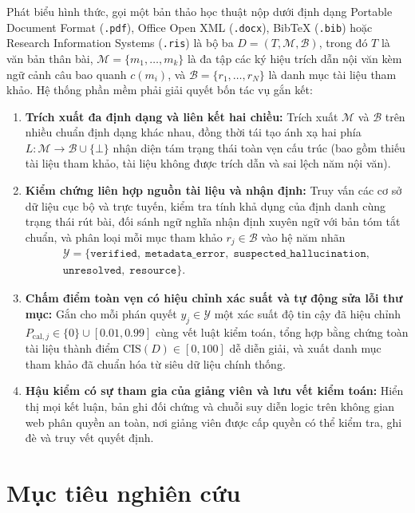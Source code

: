 Phát biểu hình thức, gọi một bản thảo học thuật nộp dưới định dạng Portable Document Format (\texttt{.pdf}), Office Open XML (\texttt{.docx}), BibTeX (\texttt{.bib}) hoặc Research Information Systems (\texttt{.ris}) là bộ ba $D = (T, \mathcal{M}, \mathcal{B})$, trong đó $T$ là văn bản thân bài, $\mathcal{M} = \{m_1, \dots, m_k\}$ là đa tập các ký hiệu trích dẫn nội văn kèm ngữ cảnh câu bao quanh $c(m_i)$, và $\mathcal{B} = \{r_1, \dots, r_N\}$ là danh mục tài liệu tham khảo. Hệ thống phần mềm phải giải quyết bốn tác vụ gắn kết:
\begin{enumerate}
    \item \textbf{Trích xuất đa định dạng và liên kết hai chiều:} Trích xuất $\mathcal{M}$ và $\mathcal{B}$ trên nhiều chuẩn định dạng khác nhau, đồng thời tái tạo ánh xạ hai phía $L: \mathcal{M} \to \mathcal{B} \cup \{\bot\}$ nhận diện tám trạng thái toàn vẹn cấu trúc (bao gồm thiếu tài liệu tham khảo, tài liệu không được trích dẫn và sai lệch năm nội văn).
    \item \textbf{Kiểm chứng liên hợp nguồn tài liệu và nhận định:} Truy vấn các cơ sở dữ liệu cục bộ và trực tuyến, kiểm tra tính khả dụng của định danh cùng trạng thái rút bài, đối sánh ngữ nghĩa nhận định xuyên ngữ với bản tóm tắt chuẩn, và phân loại mỗi mục tham khảo $r_j \in \mathcal{B}$ vào hệ năm nhãn
    \[\begin{gathered}
    \mathcal{Y} = \{\texttt{verified},\; \texttt{metadata\_error},\; \texttt{suspected\_hallucination},\\
    \texttt{unresolved},\; \texttt{resource}\}.
    \end{gathered}\]
    \item \textbf{Chấm điểm toàn vẹn có hiệu chỉnh xác suất và tự động sửa lỗi thư mục:} Gắn cho mỗi phán quyết $y_j \in \mathcal{Y}$ một xác suất độ tin cậy đã hiệu chỉnh $P_{\text{cal},j} \in \{0\} \cup [0.01, 0.99]$ cùng vết luật kiểm toán, tổng hợp bằng chứng toàn tài liệu thành điểm $\mathrm{CIS}(D) \in [0, 100]$ dễ diễn giải, và xuất danh mục tham khảo đã chuẩn hóa từ siêu dữ liệu chính thống.
    \item \textbf{Hậu kiểm có sự tham gia của giảng viên và lưu vết kiểm toán:} Hiển thị mọi kết luận, bản ghi đối chứng và chuỗi suy diễn logic trên không gian web phân quyền an toàn, nơi giảng viên được cấp quyền có thể kiểm tra, ghi đè và truy vết quyết định.
\end{enumerate}

\section{Mục tiêu nghiên cứu}
\label{sec:objectives}

